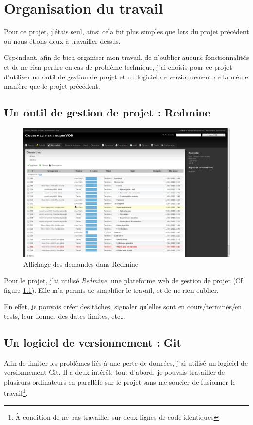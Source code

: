 \documentclass[12pt,a4paper,openany]{book}
\begin{document}
	\chapter{Organisation du travail}
	Pour ce projet, j'étais seul, ainsi cela fut plus simples que lors du projet précédent où nous étions deux à travailler dessus. 

	Cependant, afin de bien organiser mon travail, de n'oublier aucune fonctionnalités et de ne rien perdre en cas de problème
	technique, j'ai choisis pour ce projet d'utiliser un outil de gestion de projet et un logiciel de versionnement de la même
	manière que le projet précédent.
	\section{Un outil de gestion de projet : Redmine}
	\begin{figure}[H]
		\centering
		\includegraphics[width=18cm]{screens/redmine.png} %
		\caption{Affichage des demandes dans Redmine}
		\label{fig:redmine}
	\end{figure}
	Pour le projet, j'ai utilisé \textit{Redmine}, une plateforme web de gestion de projet (Cf figure \ref{fig:redmine}). Elle m'a permis 
	de simplifier le travail, et de ne rien oublier.

	En effet, je pouvais créer des tâches, signaler qu'elles sont en cours/terminés/en tests, leur donner des dates limites,
	etc\ldots 

	\section{Un logiciel de versionnement : Git}
	Afin de limiter les problèmes liés à une perte de données, j'ai utilisé un logiciel de versionnement Git. Il a deux intérêt, tout
	d'abord, je pouvais travailler de plusieurs ordinateurs en parallèle sur le projet sans me soucier de fusionner le travail\footnote{À condition de ne pas travailler sur deux lignes de code identiques}.
\end{document}
